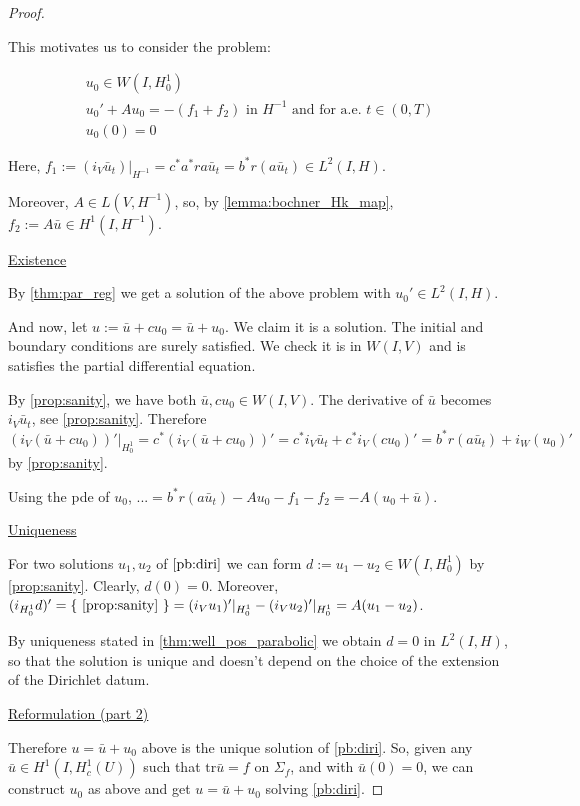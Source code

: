 \documentclass[english,a4paper,10pt,oneside]{scrbook}	%
\theoremstyle{break}
\newenvironment{mproof}[1][\proofname]{%
  \begin{proof}[#1]$ $\par\nobreak\ignorespaces
}{%
  \end{proof}
}
\renewcommand*{\proofname}{Proof}
\theoremstyle{remark}
\newcommand{\tr}{\text{tr}}
\newcommand{\ind}[1]{\{\text{ #1 }\}}
\begin{document}
\begin{mproof}
This motivates us to consider the problem: 

\begin{align}
u_0 \in W(I,H^1_0) \\
u_0' + A u_0 = -(f_1+f_2) \text{ in }H^{-1} \text{ and for a.e. } t \in (0,T) \\
u_0(0)=0
\end{align}

Here, $f_1:=(i_V\bar{u}_t)|_{H^{-1}}=c^*a^*ra\bar{u}_t = b^*r (a\bar{u}_t) \in L^2(I,H)$.

Moreover, $A \in L(V, H^{-1})$, so, by \cref{lemma:bochner_Hk_map}, $f_2:=A\bar{u} \in H^1(I, H^{-1})$.

\underline{Existence}

By \cref{thm:par_reg} we get a solution of the above problem with $u_0' \in L^2(I, H)$.

And now, let $u:=\bar{u}+c u_0 =\bar{u}+ u_0 $. We claim it is a solution. The initial and boundary conditions are surely satisfied. We check it is in $W(I,V)$ and is satisfies the partial differential equation.

By \cref{prop:sanity}, we have both $\bar{u}, c u_0 \in W(I,V)$. The derivative of $\bar{u}$ becomes $i_V \bar{u}_t$, see \cref{prop:sanity}. Therefore $(i_V(\bar{u}+c u_0))'|_{H^1_0} = c^* (i_V(\bar{u}+c u_0))' = c^*i_V \bar{u}_t + c^*i_V(c u_0)' = b^*r (a\bar{u}_t) + i_W(u_0)'$ by \cref{prop:sanity}.

Using the pde of $u_0$, $... = b^*r (a\bar{u}_t) - Au_0 -f_1 -f_2 = -A(u_0+\bar{u})$.

\underline{Uniqueness}

For two solutions $u_1, u_2$ of $\ref{pb:diri}$ we can form $d:=u_1-u_2\in W(I,H^1_0)$ by \cref{prop:sanity}. Clearly, $d(0)=0$. Moreover, $(i_{H^1_0} d)' = \ind{\cref{prop:sanity}}=(i_V u_1)'|_{H^1_0}-(i_V u_2)'|_{H^1_0} = A(u_1-u_2)$.

By uniqueness stated in \cref{thm:well_pos_parabolic} we obtain $d=0$ in $L^2(I,H)$, so that the solution is unique and doesn't depend on the choice of the extension of the Dirichlet datum.

\underline{Reformulation (part 2)}

Therefore $u=\bar{u}+u_0$ above is the unique solution of \cref{pb:diri}. So, given any $\bar{u}\in H^1(I,H^1_c(U))$ such that $\tr \bar{u} =f$ on $\Sigma_f$, and with $\bar{u}(0)=0$, we can construct $u_0$ as above and get $u=\bar{u}+u_0$ solving \cref{pb:diri}.


\end{mproof}
\end{document}
